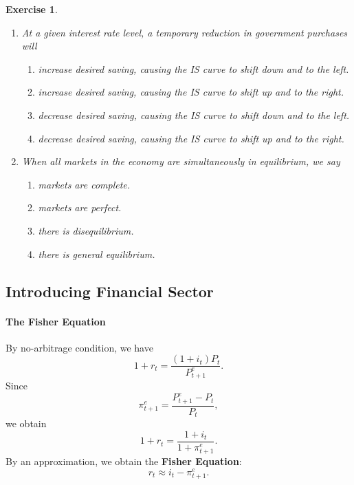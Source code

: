 \documentclass[12pt]{article}
\newtheorem{exercise}{Exercise}
\begin{document}
\begin{exercise}
    \begin{enumerate}[label=(\arabic*)]
        \item At a given interest rate level, a temporary reduction in government purchases will
        \begin{enumerate}[label=\Alph*.]
            \item increase desired saving, causing the IS curve to shift down and to the left.
            \item increase desired saving, causing the IS curve to shift up and to the right.
            \item decrease desired saving, causing the IS curve to shift down and to the left.
            \item decrease desired saving, causing the IS curve to shift up and to the right.
        \end{enumerate}
        \item When all markets in the economy are simultaneously in equilibrium, we say
        \begin{enumerate}[label=\Alph*.]
            \item markets are complete.
            \item markets are perfect.
            \item there is disequilibrium.
            \item there is general equilibrium.
        \end{enumerate}
    \end{enumerate}
\end{exercise}

\subsection*{Introducing Financial Sector}
\paragraph{The Fisher Equation}
By no-arbitrage condition, we have
\[ 1 + r_t = \frac{(1 + i_t) P_t}{P^e_{t+1}}.\]
Since
\[\pi^e_{t+1} = \frac{P^e_{t+1}-P_t}{P_t},\]
we obtain
\[1 + r_t = \frac{1 + i_t}{1 + \pi^e_{t+1}}.\]
By an approximation, we obtain the \textbf{Fisher Equation}:
\[r_t \approx i_t - \pi^e_{t+1}.\]
\end{document}
